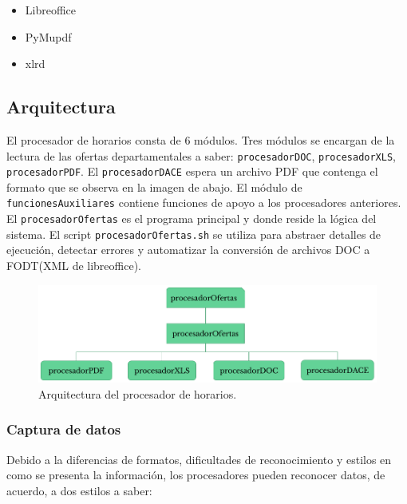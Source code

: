 \documentclass[]{article}
\begin{document}
\begin{itemize}
\itemsep1pt\parskip0pt
\item
  Libreoffice
\item
  PyMupdf
\item
  xlrd
\end{itemize}

\subsection{Arquitectura}\label{arquitectura}

El procesador de horarios consta de 6 módulos. Tres módulos se encargan
de la lectura de las ofertas departamentales a saber:
\texttt{procesadorDOC}, \texttt{procesadorXLS}, \texttt{procesadorPDF}.
El \texttt{procesadorDACE} espera un archivo PDF que contenga el formato
que se observa en la imagen de abajo. El módulo de
\texttt{funcionesAuxiliares} contiene funciones de apoyo a los
procesadores anteriores. El \texttt{procesadorOfertas} es el programa
principal y donde reside la lógica del sistema. El script
\texttt{procesadorOfertas.sh} se utiliza para abstraer detalles de
ejecución, detectar errores y automatizar la conversión de archivos DOC
a FODT(XML de libreoffice).

\begin{figure}[!h]
  \includegraphics[width=\linewidth]{Estructura.png}
  \caption{Arquitectura del procesador de horarios.}
  \label{fig:arquitectura_procesador}
\end{figure}


\subsubsection{Captura de datos}\label{captura-de-datos}

Debido a la diferencias de formatos, dificultades de reconocimiento y
estilos en como se presenta la información, los procesadores pueden
reconocer datos, de acuerdo, a dos estilos a saber:
\end{document}
